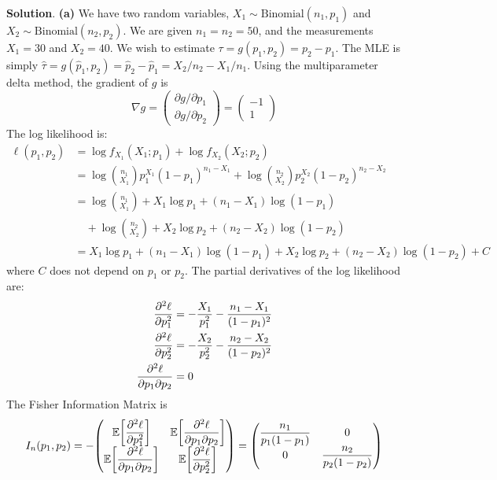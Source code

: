 \textbf{Solution}.
\textbf{(a)}
We have two random variables, \(X_{1} \sim \text{Binomial}(n_{1}, p_{1})\) and
\(X_{2} \sim \text{Binomial}(n_{2}, p_{2})\). We are given \(n_{1} = n_{2} = 50\),
and the measurements \(X_{1} = 30\) and \(X_{2} = 40\).
We wish to estimate \(\tau = g(p_{1}, p_{2}) = p_{2} - p_{1}\). The MLE is
simply
\(\hat{\tau} = g(\hat{p}_{1}, \hat{p}_{2}) = \hat{p}_{2} - \hat{p}_{1} = X_{2} / n_{2} - X_{1} / n_{1}\).
Using the multiparameter delta method, the gradient of \(g\) is
\[
\nabla g = 
\begin{pmatrix} \partial g / \partial p_{1} \\ \partial g / \partial p_{2} \end{pmatrix} 
= \begin{pmatrix} -1 \\ 1 \end{pmatrix} 
\]
The log likelihood is:
\begin{align*}
\ell(p_{1}, p_{2}) &= \log f_{X_{1}}(X_{1}; p_{1}) + \log f_{X_{2}}(X_{2}; p_{2}) \\
& = \log \binom{n_{1}}{X_{1}} p_{1}^{X_{1}} (1 - p_{1})^{n_{1} - X_{1}}
+ \log \binom{n_{2}}{X_{2}} p_{2}^{X_{2}} (1 - p_{2})^{n_{2} - X_{2}} \\
&= \log \binom{n_{1}}{X_{1}} + X_{1} \log p_{1} + (n_{1} - X_{1}) \log (1 - p_{1})
\\
& \quad 
+ \log \binom{n_{2}}{X_{2}} + X_{2} \log p_{2} + (n_{2} - X_{2}) \log (1 - p_{2}) \\
&= X_{1} \log p_{1} + (n_{1} - X_{1}) \log (1 - p_{1}) + X_{2} \log p_{2} + (n_{2} - X_{2}) \log (1 - p_{2}) + C
\end{align*}
where \(C\) does not depend on \(p_{1}\) or \(p_{2}\).
The partial derivatives of the log likelihood are:
\begin{align*}
\displaystyle\frac{\partial^{2} \ell}{\partial p_{1}^{2}} & = - \displaystyle\frac{X_{1}}{p_{1}^{2}} - \frac{n_{1} - X_{1}}{(1 - p_{1})^{2}} \\
\displaystyle\frac{\partial^{2} \ell}{\partial p_{2}^{2}} & = - \displaystyle\frac{X_{2}}{p_{2}^{2}} - \frac{n_{2} - X_{2}}{(1 - p_{2})^{2}} \\
\displaystyle\frac{\partial^{2} \ell}{\partial p_{1} \partial p_{2}} & = 0
\end{align*}
The Fisher Information Matrix is
\[
I_{n}(p_{1}, p_{2}) = -\begin{pmatrix}
\EXP\left[ \Frac{\partial^{2} \ell}{\partial p_{1}^{2}} \right]
& \EXP\left[ \Frac{\partial^{2} \ell}{\partial p_{1} \partial p_{2}} \right]  \\
\EXP\left[ \Frac{\partial^{2} \ell}{\partial p_{1} \partial p_{2}} \right]
& \EXP\left[ \Frac{\partial^{2} \ell}{\partial p_{2}^{2}} \right]
\end{pmatrix} = \begin{pmatrix}
\Frac{n_{1}}{p_{1}(1 - p_{1})} & 0 \\
0 & \Frac{n_{2}}{p_{2}(1 - p_{2})}
\end{pmatrix}
\]
